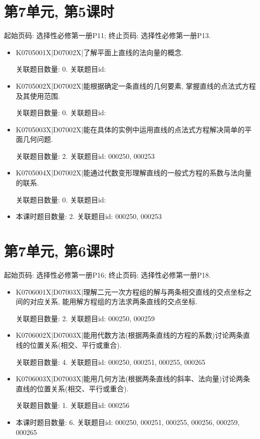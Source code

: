 \section*{第7单元, 第5课时}
起始页码: 选择性必修第一册P11; 终止页码: 选择性必修第一册P13.
\begin{itemize}
\item K0705001X|D07002X|了解平面上直线的法向量的概念.

关联题目数量: 0. 关联题目id: 

\item K0705002X|D07002X|能根据确定一条直线的几何要素, 掌握直线的点法式方程及其使用范围.

关联题目数量: 0. 关联题目id: 

\item K0705003X|D07002X|能在具体的实例中运用直线的点法式方程解决简单的平面几何问题.

关联题目数量: 2. 关联题目id: 000250, 000253

\item K0705004X|D07002X|能通过代数变形理解直线的一般式方程的系数与法向量的联系.

关联题目数量: 0. 关联题目id: 

\item 本课时题目数量: 2. 关联题目id: 000250, 000253

\end{itemize}

\section*{第7单元, 第6课时}
起始页码: 选择性必修第一册P16; 终止页码: 选择性必修第一册P18.
\begin{itemize}
\item K0706001X|D07003X|理解二元一次方程组的解与两条相交直线的交点坐标之间的对应关系, 能用解方程组的方法求两条直线的交点坐标.

关联题目数量: 2. 关联题目id: 000250, 000259

\item K0706002X|D07003X|能用代数方法(根据两条直线的方程的系数)讨论两条直线的位置关系(相交、平行或重合).

关联题目数量: 4. 关联题目id: 000250, 000251, 000255, 000265

\item K0706003X|D07003X|能用几何方法(根据两条直线的斜率、法向量)讨论两条直线的位置关系(相交、平行或重合).

关联题目数量: 1. 关联题目id: 000256

\item 本课时题目数量: 6. 关联题目id: 000250, 000251, 000255, 000256, 000259, 000265

\end{itemize}

